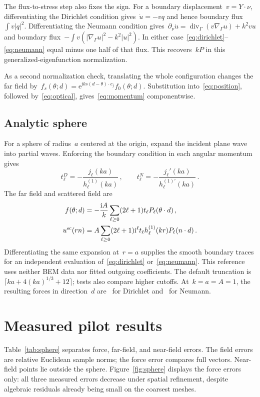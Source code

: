 \documentclass[11pt,a4paper]{article}
\numberwithin{equation}{section}
\newcommand{\ii}{\mathrm i}
\begin{document}
The flux-to-stress step also fixes the sign. For a boundary displacement~$v=Y\cdot\nu$, differentiating the Dirichlet condition gives~$\dot u=-vq$ and hence boundary flux~$\int v|q|^2$. Differentiating the Neumann condition gives~$\partial_\nu\dot u=\operatorname{div}_\Gamma(v\nabla_\Gamma u)+k^2vu$ and boundary flux~$-\int v(|\nabla_\Gamma u|^2-k^2|u|^2)$. In either case~\eqref{eq:dirichlet}--\eqref{eq:neumann} equal minus one half of that flux. This recovers~$kP$ in this generalized-eigenfunction normalization.

As a second normalization check, translating the whole configuration changes the far field by~$f_s(\theta;d)=\mathrm e^{\ii ks(d-\theta)\cdot e_j}f_0(\theta;d)$. Substitution into~\eqref{eq:position}, followed by~\eqref{eq:optical}, gives~\eqref{eq:momentum} componentwise.

\subsection{Analytic sphere}
For a sphere of radius~$a$ centered at the origin, expand the incident plane wave into partial waves. Enforcing the boundary condition in each angular momentum gives
\begin{equation}
 t_\ell^D=-\frac{j_\ell(ka)}{h_\ell^{(1)}(ka)}\,,\qquad
 t_\ell^N=-\frac{j_\ell'(ka)}{h_\ell^{(1)\prime}(ka)}\,.
\end{equation}
The far field and scattered field are
\begin{align}
 f(\theta;d)&=-\frac{\ii A}k\sum_{\ell\ge0}(2\ell+1)t_\ell
                         P_\ell(\theta\cdot d)\,,\\
 u^{\rm sc}(rn)&=A\sum_{\ell\ge0}(2\ell+1)\ii^\ell t_\ell
                       h_\ell^{(1)}(kr)P_\ell(n\cdot d)\,.
\end{align}
Differentiating the same expansion at~$r=a$ supplies the smooth boundary traces for an independent evaluation of~\eqref{eq:dirichlet} or~\eqref{eq:neumann}. This reference uses neither BEM data nor fitted outgoing coefficients. The default truncation is~$\lceil ka+4(ka)^{1/3}+12\rceil$; tests also compare higher cutoffs. At~$k=a=A=1$, the resulting forces in direction~$d$ are~\ExactD{} for Dirichlet and~\ExactN{} for Neumann.

\section{Measured pilot results}
Table~\ref{tab:sphere} separates force, far-field, and near-field errors. The field errors are relative Euclidean sample norms; the force error compares full vectors. Near-field points lie outside the sphere. Figure~\ref{fig:sphere} displays the force errors only: all three measured errors decrease under spatial refinement, despite algebraic residuals already being small on the coarsest meshes.
\end{document}
